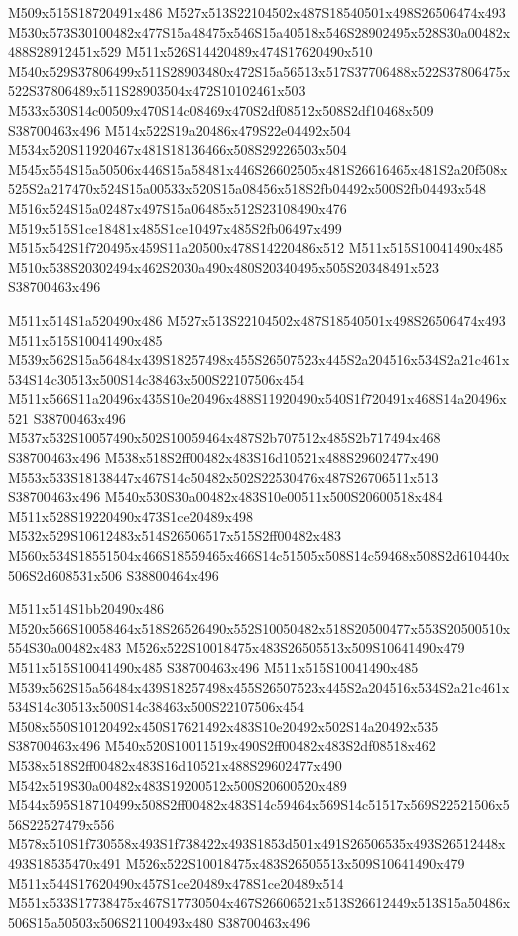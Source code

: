 \documentclass{article}
\begin{document}
\begin{multicols}{2}
M509x515S18720491x486 M527x513S22104502x487S18540501x498S26506474x493 M530x573S30100482x477S15a48475x546S15a40518x546S28902495x528S30a00482x488S28912451x529 M511x526S14420489x474S17620490x510 M540x529S37806499x511S28903480x472S15a56513x517S37706488x522S37806475x522S37806489x511S28903504x472S10102461x503 M533x530S14c00509x470S14c08469x470S2df08512x508S2df10468x509 S38700463x496 M514x522S19a20486x479S22e04492x504 M534x520S11920467x481S18136466x508S29226503x504 M545x554S15a50506x446S15a58481x446S26602505x481S26616465x481S2a20f508x525S2a217470x524S15a00533x520S15a08456x518S2fb04492x500S2fb04493x548 M516x524S15a02487x497S15a06485x512S23108490x476 M519x515S1ce18481x485S1ce10497x485S2fb06497x499 M515x542S1f720495x459S11a20500x478S14220486x512 M511x515S10041490x485 M510x538S20302494x462S2030a490x480S20340495x505S20348491x523 S38700463x496

M511x514S1a520490x486 M527x513S22104502x487S18540501x498S26506474x493 M511x515S10041490x485 M539x562S15a56484x439S18257498x455S26507523x445S2a204516x534S2a21c461x534S14c30513x500S14c38463x500S22107506x454 M511x566S11a20496x435S10e20496x488S11920490x540S1f720491x468S14a20496x521 S38700463x496 M537x532S10057490x502S10059464x487S2b707512x485S2b717494x468 S38700463x496 M538x518S2ff00482x483S16d10521x488S29602477x490 M553x533S18138447x467S14c50482x502S22530476x487S26706511x513 S38700463x496 M540x530S30a00482x483S10e00511x500S20600518x484 M511x528S19220490x473S1ce20489x498 M532x529S10612483x514S26506517x515S2ff00482x483 M560x534S18551504x466S18559465x466S14c51505x508S14c59468x508S2d610440x506S2d608531x506 S38800464x496

M511x514S1bb20490x486 M520x566S10058464x518S26526490x552S10050482x518S20500477x553S20500510x554S30a00482x483 M526x522S10018475x483S26505513x509S10641490x479 M511x515S10041490x485 S38700463x496 M511x515S10041490x485 M539x562S15a56484x439S18257498x455S26507523x445S2a204516x534S2a21c461x534S14c30513x500S14c38463x500S22107506x454 M508x550S10120492x450S17621492x483S10e20492x502S14a20492x535 S38700463x496 M540x520S10011519x490S2ff00482x483S2df08518x462 M538x518S2ff00482x483S16d10521x488S29602477x490 M542x519S30a00482x483S19200512x500S20600520x489 M544x595S18710499x508S2ff00482x483S14c59464x569S14c51517x569S22521506x556S22527479x556 M578x510S1f730558x493S1f738422x493S1853d501x491S26506535x493S26512448x493S18535470x491 M526x522S10018475x483S26505513x509S10641490x479 M511x544S17620490x457S1ce20489x478S1ce20489x514 M551x533S17738475x467S17730504x467S26606521x513S26612449x513S15a50486x506S15a50503x506S21100493x480 S38700463x496


\end{multicols}
\end{document}
